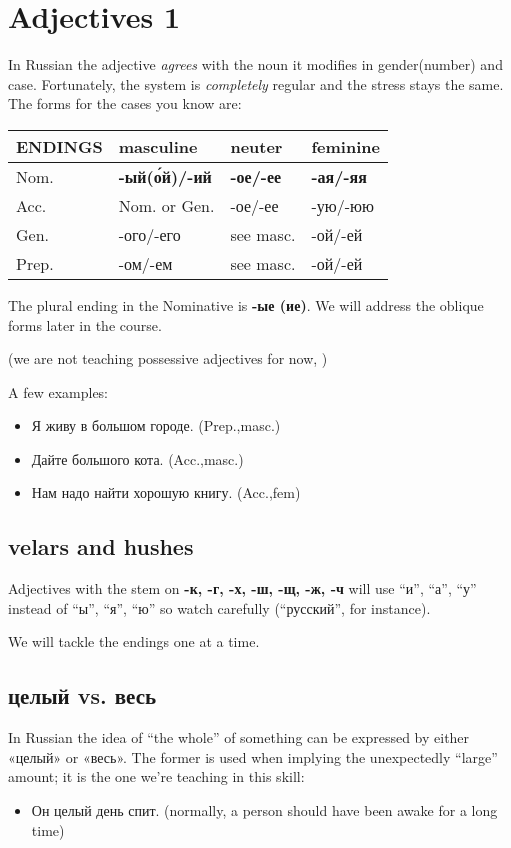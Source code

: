 \chapter{Adjectives 1}\label{adjectives-1}

In Russian the adjective \emph{agrees} with the noun it modifies in
gender(number) and case. Fortunately, the system is \emph{completely}
regular and the stress stays the same. The forms for the cases you know
are:

\begin{longtable}[]{@{}llll@{}}
\toprule
\textbf{ENDINGS} & masculine & neuter & feminine\tabularnewline
\midrule
\endhead
Nom. & \textbf{-ый(\'{о}й)/-ий} & \textbf{-ое/-ее} &
\textbf{-ая/-яя}\tabularnewline
Acc. & Nom. or Gen. & -ое/-ее & -ую/-юю\tabularnewline
Gen. & -ого/-его & see masc. & -ой/-ей\tabularnewline
Prep. & -ом/-ем & see masc. & -ой/-ей\tabularnewline
\bottomrule
\end{longtable}

The plural ending in the Nominative is \textbf{-ые (ие)}. We will
address the oblique forms later in the course.

(we are not teaching possessive adjectives for now, )

A few examples:

\begin{itemize}
\tightlist
\item
  Я живу в большом городе. (Prep.,masc.)
\item
  Дайте большого кота. (Acc.,masc.)
\item
  Нам надо найти хорошую книгу. (Acc.,fem)
\end{itemize}

\section{velars and hushes}\label{velars-and-hushes}

Adjectives with the stem on \textbf{-к, -г, -х, -ш, -щ, -ж, -ч} will use
``и'', ``а'', ``у'' instead of ``ы'', ``я'', ``ю'' so watch carefully
(``русский'', for instance).

We will tackle the endings one at a time.

\section{целый vs.
весь}\label{ux446ux435ux43bux44bux439-vs.-ux432ux435ux441ux44c}

In Russian the idea of ``the whole'' of something can be expressed by
either «целый» or «весь». The former is used when implying the
unexpectedly ``large'' amount; it is the one we're teaching in this
skill:

\begin{itemize}
\tightlist
\item
  Он целый день спит. (normally, a person should have been awake for a
  long time)
\end{itemize}
